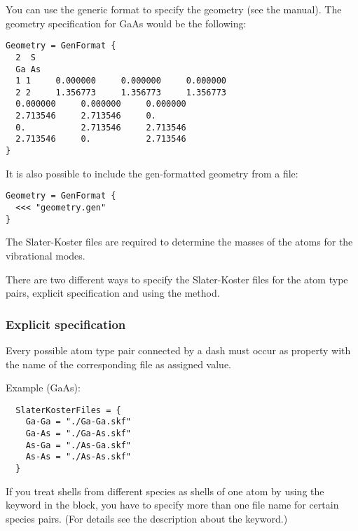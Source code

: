 \documentclass[a4paper,11pt]{report}
\begin{document}

You can use the generic format to specify the geometry (see the
{\dftbp} manual). The geometry specification for GaAs would be the
following:
\begin{verbatim}
Geometry = GenFormat {
  2  S
  Ga As
  1 1     0.000000     0.000000     0.000000
  2 2     1.356773     1.356773     1.356773
  0.000000     0.000000     0.000000
  2.713546     2.713546     0.      
  0.           2.713546     2.713546
  2.713546     0.           2.713546
}
\end{verbatim}
It is also possible to include the gen-formatted geometry from a file:
\begin{verbatim}
Geometry = GenFormat {
  <<< "geometry.gen"
}
\end{verbatim}


The Slater-Koster files are required to determine the masses of the
atoms for the vibrational modes.

There are two different ways to specify the Slater-Koster files for
the atom type pairs, explicit specification and using the
 method.

\subsubsection{Explicit specification}

Every possible atom type pair connected by a dash must occur as property with
the name of the corresponding file as assigned value.

Example (GaAs):
  \invparskip
\begin{verbatim}
  SlaterKosterFiles = {
    Ga-Ga = "./Ga-Ga.skf"
    Ga-As = "./Ga-As.skf"
    As-Ga = "./As-Ga.skf"
    As-As = "./As-As.skf"
  }
\end{verbatim}

If you treat shells from different species as shells of one atom by using the
 keyword in the  block, you have
to specify more than one file name for certain species pairs. (For details see
the description about the  keyword.)

\end{document}
